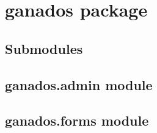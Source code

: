 \documentclass[letterpaper,10pt,english]{sphinxmanual}
\begin{document}
\section{ganados package}
\label{ganados::doc}\label{ganados:ganados-package}

\subsection{Submodules}
\label{ganados:submodules}

\subsection{ganados.admin module}
\label{ganados:ganados-admin-module}\label{ganados:module-ganados.admin}

\subsection{ganados.forms module}
\label{ganados:ganados-forms-module}\label{ganados:module-ganados.forms}
\end{document}
